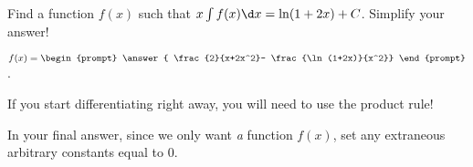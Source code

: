 \documentclass{ximera}
\author{Jim Talamo}
\begin{document}
\begin{exercise}
Find a function $f(x)$ such that $x \int f(x) \d x = \ln(1+2x) +C$.  Simplify your answer!

$f(x) = \begin{prompt} \answer{ \frac{2}{x+2x^2}- \frac{\ln(1+2x)}{x^2}} \end{prompt}$.

\begin{hint}
If you start differentiating right away, you will need to use the product rule!  

In your final answer, since we only want \emph{a} function $f(x)$, set any extraneous arbitrary constants equal to 0.
\end{hint}

\end{exercise}
\end{document}
